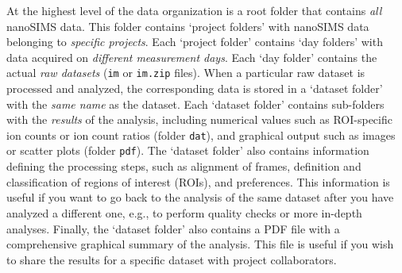 \documentclass[a4paper, 11pt]{article}
\newcommand{\ttt}[1]{\texttt{#1}}
\newcounter{step}
\begin{document}
At the highest level of the data organization is a root folder that contains \emph{all} nanoSIMS data. This folder contains `project folders' with nanoSIMS data belonging to \emph{specific projects}. Each `project folder' contains `day folders' with data acquired on \emph{different measurement days}. Each `day folder' contains the actual \emph{raw datasets} (\ttt{im} or \ttt{im.zip} files). When a particular raw dataset is processed and analyzed, the corresponding data is stored in a `dataset folder' with the \emph{same name} as the dataset. Each `dataset folder' contains sub-folders with the \emph{results} of the analysis, including numerical values such as ROI-specific ion counts or ion count ratios (folder \ttt{dat}), and graphical output such as images or scatter plots (folder \ttt{pdf}). The `dataset folder' also contains information defining the processing steps, such as alignment of frames, definition and classification of regions of interest (ROIs), and preferences. This information is useful if you want to go back to the analysis of the same dataset after you have analyzed a different one, e.g., to perform quality checks or more in-depth analyses. Finally, the `dataset folder' also contains a PDF file with a comprehensive graphical summary of the analysis. This file is useful if you wish to share the results for a specific dataset with project collaborators.
\end{document}

